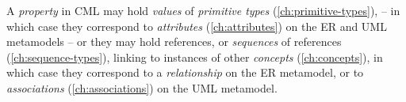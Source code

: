 A \emph{property} in CML may hold \emph{values} of \emph{primitive types} (\ref{ch:primitive-types}),
-- in which case they correspond to \emph{attributes} (\ref{ch:attributes})
on the ER \cite{er} and UML \cite{uml} metamodels --
or they may hold references, or \emph{sequences} of references (\ref{ch:sequence-types}),
linking to instances of other \emph{concepts} (\ref{ch:concepts}),
in which case they correspond to a \emph{relationship} on the ER metamodel,
or to \emph{associations} (\ref{ch:associations}) on the UML metamodel.